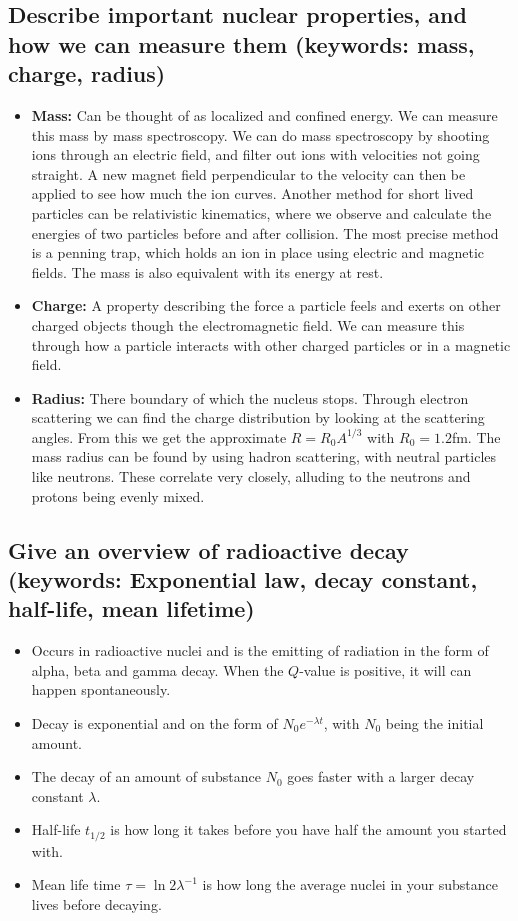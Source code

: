 \documentclass{article}
\begin{document}
\subsection{Describe important nuclear properties, and how we can measure them (keywords: mass, charge, radius)}
\begin{itemize}
    \item \textbf{Mass:} Can be thought of as localized and confined energy. We can measure this mass by mass spectroscopy. We can do mass spectroscopy by shooting ions through an electric field, and filter out ions with velocities not going straight. A new magnet field perpendicular to the velocity can then be applied to see how much the ion curves. Another method for short lived particles can be relativistic kinematics, where we observe and calculate the energies of two particles before and after collision. The most precise method is a penning trap, which holds an ion in place using electric and magnetic fields. The mass is also equivalent with its energy at rest.  
    \item \textbf{Charge:} A property describing the force a particle feels and exerts on other charged objects though the electromagnetic field. We can measure this through how a particle interacts with other charged particles or in a magnetic field. 
    \item \textbf{Radius:} There boundary of which the nucleus stops. Through electron scattering we can find the charge distribution by looking at the scattering angles. From this we get the approximate $R = R_0A^{1/3}$ with $R_0 = 1.2$fm. The mass radius can be found by using hadron scattering, with neutral particles like neutrons. These correlate very closely, alluding to the neutrons and protons being evenly mixed.  
\end{itemize}


\subsection{Give an overview of radioactive decay (keywords: Exponential law, decay constant, half-life, mean lifetime)}
\begin{itemize}
    \item Occurs in radioactive nuclei and is the emitting of radiation in the form of alpha, beta and gamma decay. When the $Q$-value is positive, it will can happen spontaneously. 
    \item Decay is exponential and on the form of $N_0e^{-λt}$, with $N_0$ being the initial amount.
    \item The decay of an amount of substance $N_0$ goes faster with a larger decay constant $λ$. 
    \item Half-life $t_{1/2}$ is how long it takes before you have half the amount you started with. 
    \item Mean life time $τ = \ln 2λ^{-1}$ is how long the average nuclei in your substance lives before decaying. 
\end{itemize} 
\end{document}
